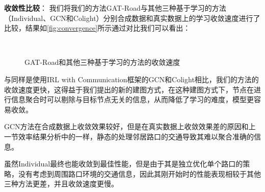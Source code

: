 \textbf{收敛性比较}：
我们将我们的方法GAT-Road与其他三种基于学习的方法（Individual、GCN和Colight）分别合成数据和真实数据上的学习收敛速度进行了比较，结果如\autoref{fig:convergence}所示通过对比我们可以看出：
\begin{figure}[t]
  \quad
  \\
  \quad
  \caption[]{GAT-Road和其他三种基于学习的方法的收敛速度}
  \label{fig:convergence}
\end{figure}
与同样是使用IRL with Communication框架的GCN和Colight相比，我们的方法的收敛速度更快，这得益于我们提出的新的建图方式，在这种建图方式下，节点在进行信息聚合时可以剔除与目标节点无关的信息，从而降低了学习的难度，模型更容易收敛。

GCN方法在合成数据上收敛效果较好，但是在真实数据上收敛效果差的原因和上一节效率结果分析中的一样，静态的处理邻居路口的交通导致其难以聚合准确的信息。

虽然Individual最终也能收敛到最佳性能，但是由于其是独立优化单个路口的策略，没有考虑到周围路口环境的交通信息，因此其刚开始时的性能表现相较于其他三种方法更差，并且收敛速度更慢。
